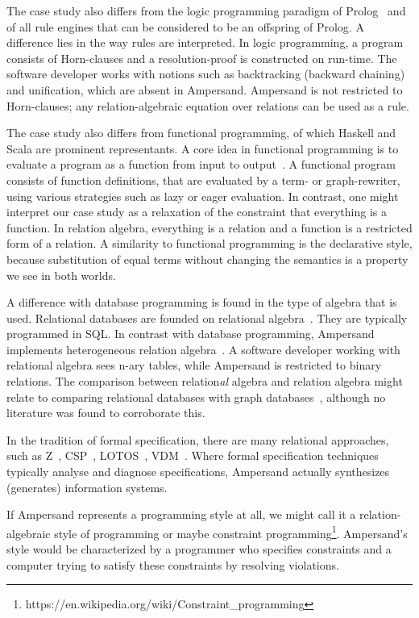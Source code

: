 \documentclass{svproc}
\begin{document}
	The case study also differs from the logic programming paradigm of Prolog~\cite{Lloyd1984} and of all rule engines that can be considered to be an offspring of Prolog.
	A difference lies in the way rules are interpreted.
	In logic programming, a program consists of Horn-clauses and a resolution-proof is constructed on run-time.
	The software developer works with notions such as backtracking (backward chaining) and unification, which are absent in Ampersand.
	Ampersand is not restricted to Horn-clauses; any relation-algebraic equation over relations can be used as a rule.

	The case study also differs from functional programming, of which Haskell and Scala are prominent representants.
	A core idea in functional programming is to evaluate a program as a function from input to output~\cite{Backus1978}.
	A functional program consists of function definitions, that are evaluated by a term- or graph-rewriter, using various strategies such as lazy or eager evaluation.
	In contrast, one might interpret our case study as a relaxation of the constraint that everything is a function.
	In relation algebra, everything is a relation and a function is a restricted form of a relation.
	A similarity to functional programming is the declarative style, because substitution of equal terms without changing the semantics is a property we see in both worlds.

	A difference with database programming is found in the type of algebra that is used.
	Relational databases are founded on relational algebra~\cite{Codd70}. They are typically programmed in SQL.
	In contrast with database programming, Ampersand implements heterogeneous relation algebra~\cite{Schmidt1997}.
	A software developer working with relational algebra sees n-ary tables, while Ampersand is restricted to binary relations.
	The comparison between relation{\it al} algebra and relation algebra might relate to comparing relational databases with graph databases~\cite{Vicknair2010},
	although no literature was found to corroborate this.

	In the tradition of formal specification, there are many relational approaches, such as Z~\cite{Z}, CSP~\cite{CSP}, LOTOS~\cite{LOTOS}, VDM~\cite{VDM}.
	Where formal specification techniques typically analyse and diagnose specifications,
	Ampersand actually synthesizes (generates) information systems.

	If Ampersand represents a programming style at all, we might call it a relation-algebraic style of programming or maybe constraint programming\footnote{https://en.wikipedia.org/wiki/Constraint\_programming}.
	Ampersand's style would be characterized by a programmer who specifies constraints and a computer trying to satisfy these constraints by resolving violations.
\end{document}
